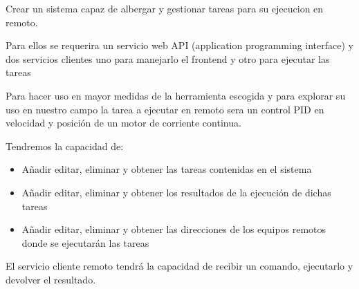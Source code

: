 Crear un sistema capaz de albergar y gestionar tareas para su ejecucion en remoto.

Para ellos se requerira un servicio web API (application programming interface) y dos servicios clientes uno para manejarlo el frontend y otro para ejecutar las tareas

Para hacer uso en mayor medidas de la herramienta escogida y para explorar su uso en nuestro campo la tarea a ejecutar en remoto sera un control PID en velocidad y posición de un motor de corriente continua.

Tendremos la capacidad de:

\begin{itemize}
	\item Añadir editar, eliminar y obtener las tareas contenidas en el sistema
	\item Añadir editar, eliminar y obtener los resultados de la ejecución de dichas tareas
	\item Añadir editar, eliminar y obtener las direcciones de los equipos remotos donde se ejecutarán las tareas
\end{itemize} 

El servicio cliente remoto tendrá la capacidad de recibir un comando, ejecutarlo y devolver el resultado.
